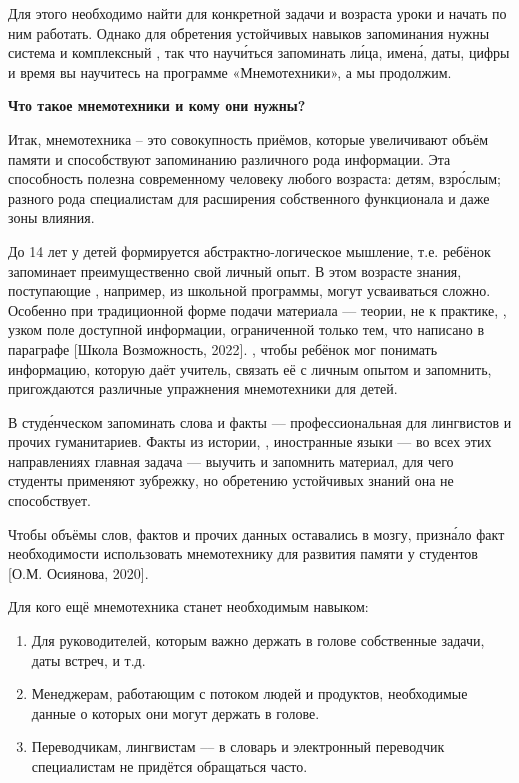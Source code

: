 Для этого необходимо найти  для конкретной задачи и возраста уроки и начать по ним работать. Однако для обретения устойчивых навыков запоминания нужны система и комплексный , так что науч\'{и}ться запоминать л\'{и}ца, имен\'{а}, даты, цифры и время вы научитесь на программе «Мнемотехники», а мы продолжим.

\textbf{Что такое мнемотехники и кому они нужны?}

Итак, мнемотехника – это совокупность приёмов, которые увеличивают объём памяти и способствуют запоминанию различного рода информации. Эта способность полезна современному человеку любого возраста: детям, взр\'{о}слым; разного рода специалистам для расширения собственного функционала и даже зоны влияния.

До 14 лет у детей формируется абстрактно-логическое мышление, т.е. ребёнок запоминает преимущественно свой личный опыт. В этом возрасте знания, поступающие , например, из школьной программы, могут усваиваться сложно. Особенно при традиционной форме подачи материала ---  теории, не  к практике, , узком поле доступной информации, ограниченной только тем, что написано в параграфе [Школа Возможность, 2022]. , чтобы ребёнок мог понимать информацию, которую даёт учитель, связать её с личным опытом и запомнить, пригождаются различные упражнения мнемотехники для детей.

В студ\'{е}нческом  запоминать слова и факты --- профессиональная  для лингвистов и прочих гуманитариев. Факты из истории, , иностранные языки --- во всех этих направлениях главная задача --- выучить и запомнить материал, для чего студенты применяют зубрежку, но обретению устойчивых знаний она не способствует.

Чтобы объёмы слов, фактов и прочих данных оставались в мозгу,  призн\'{а}ло факт необходимости использовать мнемотехнику для развития памяти у студентов [О.М. Осиянова, 2020].

Для кого ещё мнемотехника станет необходимым навыком:
\begin{enumerate}
    \item Для руководителей, которым важно держать в голове собственные задачи, даты встреч,   и т.д.
    \item Менеджерам, работающим с потоком людей и продуктов, необходимые данные о которых они могут держать в голове.
    \item Переводчикам, лингвистам --– в словарь и электронный переводчик специалистам не придётся обращаться часто.
\end{enumerate}

